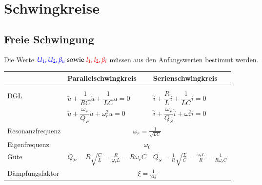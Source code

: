 \section{Schwingkreise}
\subsection{Freie Schwingung}
Die Werte $\textcolor{blue}{U_1,U_2,\beta_u}\text{ sowie
}\textcolor{red}{I_1,I_2,\beta_i}$ müssen aus den Anfangswerten bestimmt
werden.\\
\renewcommand{\arraystretch}{2.3}
\begin{tabular}{| p{4cm} | p{7cm} | p{7cm} |}
	\hline
		& \textbf{Parallelschwingkreis} 
		& \textbf{Serienschwingkreis} \\
	\hline
	& & \\
	& 
	& \\
	\hline	
	DGL &
  $\ddot{u} + \dfrac{1}{RC} \dot{u} + \dfrac{1}{LC} u = 0$
  & $\ddot{i} + \dfrac{R}{L} \dot{i} + \dfrac{1}{LC} i = 0$\\
  & $\ddot{u} + \dfrac{\omega_r}{Q_P} \dot{u} + \omega_r^2 u = 0$
  & $\ddot{i} + \dfrac{\omega_r}{Q_S} \dot{i} + \omega_r^2 i = 0$\\
	\hline
	Resonanzfrequenz & \multicolumn{2}{|c|}{$\omega_r =
	\frac{1}{\sqrt{LC}}$} \\
	\hline
	Eigenfrequenz & \multicolumn{2}{|c|}{$\omega_0$} \\
	\hline
	Güte & 
	$Q_P = R\sqrt{\frac{C}{L}} = \frac{R}{\omega_r L}=R\omega_rC$ &
	$Q_S = \frac{1}{R}\sqrt{\frac{L}{C}} = \frac{\omega_r
	L}{R}=\frac{1}{R\omega_rC}$\\
	\hline
	Dämpfungsfaktor & \multicolumn{2}{|c|}{$\xi=\frac{1}{2Q}$} \\
	\hline
	

\end{tabular}
